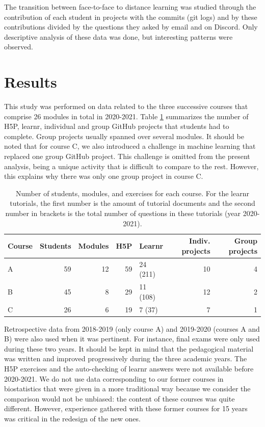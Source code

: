 \documentclass{aims}
\theoremstyle{definition}
\begin{document}
The transition between face-to-face to distance learning was studied
through the contribution of each student in projects with the commits
(git logs) and by these contributions divided by the questions they
asked by email and on Discord. Only descriptive analysis of these data
was done, but interesting patterns were observed.

\hypertarget{results}{%
\section{Results}\label{results}}

This study was performed on data related to the three successive courses
that comprise 26 modules in total in 2020-2021. Table
\ref {tab:tab_course} summarizes the number of H5P, learnr, individual
and group GitHub projects that students had to complete. Group projects
usually spanned over several modules. It should be noted that for course
C, we also introduced a challenge in machine learning that replaced one
group GitHub project. This challenge is omitted from the present
analysis, being a unique activity that is difficult to compare to the
rest. However, this explains why there was only one group project in
course C.

\begin{table}

\caption{\label{tab:tab_course_summary}\label{tab:tab_course} Number of students, modules, and exercises for each course. For the learnr tutorials, the first number is the amount of tutorial documents and the second number in brackets is the total number of questions in these tutorials (year 2020-2021).}
\centering
\begin{tabular}[t]{l|r|r|r|l|r|r}
\hline
Course & Students & Modules & H5P & Learnr & Indiv. projects & Group projects\\
\hline
A & 59 & 12 & 59 & 24 (211) & 10 & 4\\
\hline
B & 45 & 8 & 29 & 11 (108) & 12 & 2\\
\hline
C & 26 & 6 & 19 & 7 (37) & 7 & 1\\
\hline
\end{tabular}
\end{table}

Retrospective data from 2018-2019 (only course A)
\cite{Grosjeandataset2018} and 2019-2020 (courses A and B)
\cite{Grosjeandataset2019} were also used when it was pertinent. For
instance, final exams were only used during these two years. It should
be kept in mind that the pedagogical material was written and improved
progressively during the three academic years. The H5P exercises and the
auto-checking of learnr answers were not available before 2020-2021. We
do not use data corresponding to our former courses in biostatistics
that were given in a more traditional way because we consider the
comparison would not be unbiased: the content of these courses was quite
different. However, experience gathered with these former courses for 15
years was critical in the redesign of the new ones.
\end{document}
